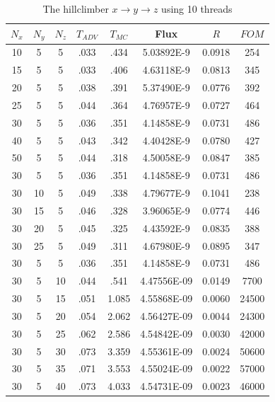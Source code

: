 \documentclass{article}
\begin{document}
\begin{table}
\begin{center}
\label{tbl_decay2}
\caption{The hillclimber $x \rightarrow y \rightarrow z$ using 10 threads}
\begin{tabular}{|c|c|c|c|c|c|c|c|}
\hline
$N_x$ & $N_y$ & $N_z$ & $T_{ADV}$ & $T_{MC}$ & \textbf{Flux} & $R$ & $FOM$ \\ \hline
10 &  5 &  5 & .033 & .434 & 5.03892E-9  & 0.0918 & 254 \\ \hline
15 &  5 &  5 & .033 & .406 & 4.63118E-9  & 0.0813 & 345 \\ \hline
20 &  5 &  5 & .038 & .391 & 5.37490E-9  & 0.0776 & 392 \\ \hline
25 &  5 &  5 & .044 & .364 & 4.76957E-9  & 0.0727 & 464 \\ \hline
30 &  5 &  5 & .036 & .351 & 4.14858E-9  & 0.0731 & 486 \\ \hline
40 &  5 &  5 & .043 & .342 & 4.40428E-9  & 0.0780 & 427 \\ \hline
50 &  5 &  5 & .044 & .318 & 4.50058E-9  & 0.0847 & 385 \\ \hline \hline

30 &  5 & 5 & .036 & .351 & 4.14858E-9  & 0.0731 & 486 \\ \hline
30 & 10 & 5 & .049 & .338 & 4.79677E-9  & 0.1041 & 238 \\ \hline
30 & 15 & 5 & .046 & .328 & 3.96065E-9  & 0.0774 & 446 \\ \hline
30 & 20 & 5 & .045 & .325 & 4.43592E-9  & 0.0835 & 388 \\ \hline
30 & 25 & 5 & .049 & .311 & 4.67980E-9  & 0.0895 & 347 \\ \hline \hline

30 &  5 &  5 & .036 & .351 & 4.14858E-9  & 0.0731 & 486 \\ \hline
30 &  5 & 10 & .044 & .541 & 4.47556E-09  & 0.0149 & 7700 \\ \hline
30 &  5 & 15 & .051 & 1.085 & 4.55868E-09  & 0.0060 & 24500 \\ \hline
30 &  5 & 20 & .054 & 2.062 & 4.56427E-09  & 0.0044 & 24300 \\ \hline
30 &  5 & 25 & .062 & 2.586 & 4.54842E-09  & 0.0030 & 42000 \\ \hline
30 &  5 & 30 & .073 & 3.359 & 4.55361E-09  & 0.0024 & 50600 \\ \hline
30 &  5 & 35 & .071 & 3.553 & 4.55024E-09  & 0.0022 & 57000 \\ \hline
30 &  5 & 40 & .073 & 4.033 & 4.54731E-09  & 0.0023 & 46000 \\ \hline \hline


\end{tabular}
\end{center}
\end{table}
\end{document}
